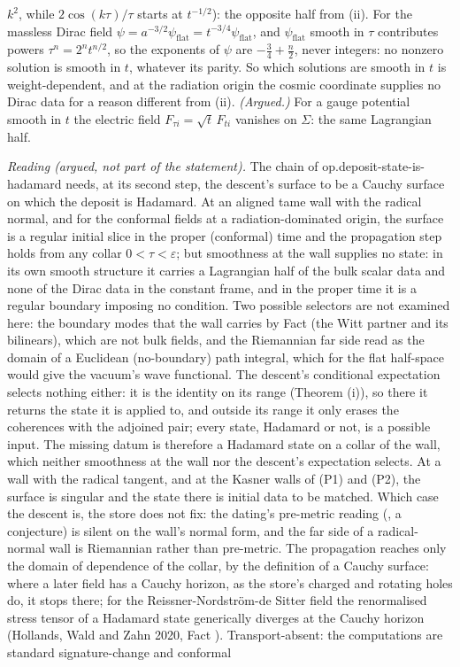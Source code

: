 $k^{2}$, while $2\cos(k\tau)/\tau$ starts at $t^{-1/2}$): the opposite half from (ii). For the massless Dirac field $\psi = a^{-3/2}\psi_{\mathrm{flat}} = t^{-3/4}\psi_{\mathrm{flat}}$, and $\psi_{\mathrm{flat}}$ smooth in $\tau$ contributes powers $\tau^{n} = 2^{n}t^{n/2}$, so the exponents of $\psi$ are $-\tfrac34 + \tfrac{n}{2}$, never integers: no nonzero solution is smooth in $t$, whatever its parity. So which solutions are smooth in $t$ is weight-dependent, and at the radiation origin the cosmic coordinate supplies no Dirac data for a reason different from (ii). \emph{(Argued.)} For a gauge potential smooth in $t$ the electric field $F_{\tau i} = \sqrt{t}\,F_{ti}$ vanishes on $\Sigma$: the same Lagrangian half.

\emph{Reading (argued, not part of the statement).} The chain of op.deposit-state-is-hadamard needs, at its second step, the descent's surface to be a Cauchy surface on which the deposit is Hadamard. At an aligned tame wall with the radical normal, and for the conformal fields at a radiation-dominated origin, the surface is a regular initial slice in the proper (conformal) time and the propagation step holds from any collar $0 < \tau < \varepsilon$; but smoothness at the wall supplies no state: in its own smooth structure it carries a Lagrangian half of the bulk scalar data and none of the Dirac data in the constant frame, and in the proper time it is a regular boundary imposing no condition. Two possible selectors are not examined here: the boundary modes that the wall carries by Fact  (the Witt partner and its bilinears), which are not bulk fields, and the Riemannian far side read as the domain of a Euclidean (no-boundary) path integral, which for the flat half-space would give the vacuum's wave functional. The descent's conditional expectation selects nothing either: it is the identity on its range (Theorem (i)), so there it returns the state it is applied to, and outside its range it only erases the coherences with the adjoined pair; every state, Hadamard or not, is a possible input. The missing datum is therefore a Hadamard state on a collar of the wall, which neither smoothness at the wall nor the descent's expectation selects. At a wall with the radical tangent, and at the Kasner walls of (P1) and (P2), the surface is singular and the state there is initial data to be matched. Which case the descent is, the store does not fix: the dating's pre-metric reading (, a conjecture) is silent on the wall's normal form, and the far side of a radical-normal wall is Riemannian rather than pre-metric. The propagation reaches only the domain of dependence of the collar, by the definition of a Cauchy surface: where a later field has a Cauchy horizon, as the store's charged and rotating holes do, it stops there; for the Reissner-Nordstr\"om-de Sitter field the renormalised stress tensor of a Hadamard state generically diverges at the Cauchy horizon (Hollands, Wald and Zahn 2020, Fact ). Transport-absent: the computations are standard signature-change and conformal 